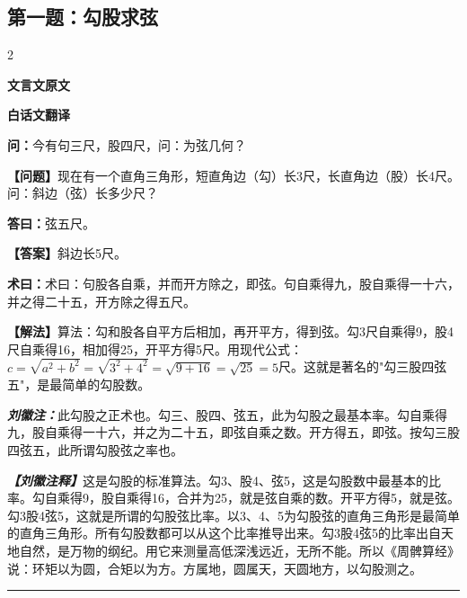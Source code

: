 \documentclass[10pt,a4paper]{article}
\newcommand{\wen}[1]{\textbf{\color{problemcolor}问：}#1\par}
\newcommand{\da}[1]{\textbf{答曰：}#1\par}
\newcommand{\shu}[1]{\textbf{术曰：}#1\par}
\newcommand{\liuhui}[1]{{\color{commentarycolor}\textit{\textbf{刘徽注：}}#1\par}}
\newcommand{\classicalheader}[1]{{\centering\large\bfseries\color{classicalcolor} #1\par\vspace{0.5em}}}
\newcommand{\wenmodern}[1]{\textbf{\color{moderncolor}【问题】}#1\par}
\newcommand{\damodern}[1]{\textbf{【答案】}#1\par}
\newcommand{\shumodern}[1]{\textbf{【解法】}#1\par}
\newcommand{\liuhuimodern}[1]{{\color{commentarycolor}\textit{\textbf{【刘徽注释】}}#1\par}}
\newcommand{\modernheader}[1]{{\centering\large\bfseries\color{moderncolor} #1\par\vspace{0.5em}}}
\newcommand{\problemsec}[1]{\subsection*{#1}}
\begin{document}
\vspace{0.5cm}


\problemsec{第一题：勾股求弦}
\begin{paracol}{2}
\classicalheader{文言文原文}
\switchcolumn
\modernheader{白话文翻译}
\switchcolumn*

\wen{今有句三尺，股四尺，问：为弦几何？}

\switchcolumn

\wenmodern{现在有一个直角三角形，短直角边（勾）长3尺，长直角边（股）长4尺。问：斜边（弦）长多少尺？}

\switchcolumn*

\da{弦五尺。}

\switchcolumn

\damodern{斜边长5尺。}

\switchcolumn*

\shu{术曰：句股各自乘，并而开方除之，即弦。句自乘得九，股自乘得一十六，并之得二十五，开方除之得五尺。}

\switchcolumn

\shumodern{算法：勾和股各自平方后相加，再开平方，得到弦。勾3尺自乘得9，股4尺自乘得16，相加得25，开平方得5尺。用现代公式：$c=\sqrt{a^2+b^2}=\sqrt{3^2+4^2}=\sqrt{9+16}=\sqrt{25}=5$尺。这就是著名的"勾三股四弦五"，是最简单的勾股数。}

\switchcolumn*

\liuhui{此勾股之正术也。勾三、股四、弦五，此为勾股之最基本率。勾自乘得九，股自乘得一十六，并之为二十五，即弦自乘之数。开方得五，即弦。按勾三股四弦五，此所谓勾股弦之率也。}

\switchcolumn

\liuhuimodern{这是勾股的标准算法。勾3、股4、弦5，这是勾股数中最基本的比率。勾自乘得9，股自乘得16，合并为25，就是弦自乘的数。开平方得5，就是弦。勾3股4弦5，这就是所谓的勾股弦比率。以3、4、5为勾股弦的直角三角形是最简单的直角三角形。所有勾股数都可以从这个比率推导出来。勾3股4弦5的比率出自天地自然，是万物的纲纪。用它来测量高低深浅远近，无所不能。所以《周髀算经》说：环矩以为圆，合矩以为方。方属地，圆属天，天圆地方，以勾股测之。}

\end{paracol}

\vspace{0.3cm}
\hrule
\vspace{0.3cm}
\end{document}

